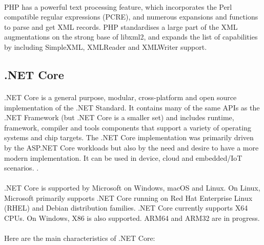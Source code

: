 \documentclass[../thesis.tex]{subfiles}
\begin{document}
\paragraph{}
PHP has a powerful text processing feature, which incorporates the Perl compatible regular expressions (PCRE), and numerous expansions and functions to parse and get XML records. PHP standardises a large part of the XML augmentations on the strong base of libxml2, and expands the list of capabilities by including SimpleXML, XMLReader and XMLWriter support.

\subsection{.NET Core}
\paragraph{}
.NET Core is a general purpose, modular, cross-platform and open source implementation of the .NET Standard. It contains many of the same APIs as the .NET Framework (but .NET Core is a smaller set) and includes runtime, framework, compiler and tools components that support a variety of operating systems and chip targets. The .NET Core implementation was primarily driven by the ASP.NET Core workloads but also by the need and desire to have a more modern implementation. It can be used in device, cloud and embedded/IoT scenarios. \cite{dotnet}.
\paragraph{}
.NET Core is supported by Microsoft on Windows, macOS and Linux. On Linux, Microsoft primarily supports .NET Core running on Red Hat Enterprise Linux (RHEL) and Debian distribution families. .NET Core currently supports X64 CPUs. On Windows, X86 is also supported. ARM64 and ARM32 are in progress.
\paragraph{}
Here are the main characteristics of .NET Core:
\end{document}

